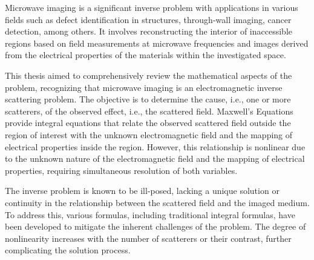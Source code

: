 		
		Microwave imaging is a significant inverse problem with applications in various fields such as defect identification in structures, through-wall imaging, cancer detection, among others. It involves reconstructing the interior of inaccessible regions based on field measurements at microwave frequencies and images derived from the electrical properties of the materials within the investigated space.
		
		This thesis aimed to comprehensively review the mathematical aspects of the problem, recognizing that microwave imaging is an electromagnetic inverse scattering problem. The objective is to determine the cause, i.e., one or more scatterers, of the observed effect, i.e., the scattered field. Maxwell's Equations provide integral equations that relate the observed scattered field outside the region of interest with the unknown electromagnetic field and the mapping of electrical properties inside the region. However, this relationship is nonlinear due to the unknown nature of the electromagnetic field and the mapping of electrical properties, requiring simultaneous resolution of both variables.
		
		The inverse problem is known to be ill-posed, lacking a unique solution or continuity in the relationship between the scattered field and the imaged medium. To address this, various formulas, including traditional integral formulas, have been developed to mitigate the inherent challenges of the problem. The degree of nonlinearity increases with the number of scatterers or their contrast, further complicating the solution process.
		
